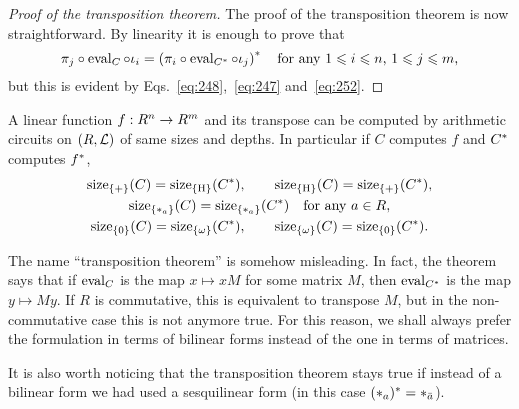 \begin{proof}[Proof of the transposition theorem]
  The proof of the transposition theorem is now straightforward. By linearity
  it is enough to prove that
  \begin{equation}
    \label{eq:242}
    \pi_j\circ\operatorname{eval}_C\circ\iota_i =
    \left(\pi_i\circ\operatorname{eval}_{C^\ast}\circ\iota_j \right)^\ast
    \quad\text{for any $1\leqslant i\leqslant n$, $1\leqslant j\leqslant m$,}
  \end{equation}
  but this is evident by Eqs.~\eqref{eq:248},~\eqref{eq:247}
  and~\eqref{eq:252}.
\end{proof}

\begin{corollary}
  A linear function $f:R^n\rightarrow R^m$ and its transpose can be computed
  by arithmetic circuits on $(R,\mathcal{L})$ of same sizes and depths. In
  particular if $C$ computes $f$ and $C^\ast$ computes $f^\ast$,
  \begin{gather*}
    \operatorname{size}_{\{+\}}(C) = \operatorname{size}_{\{\operatorname{H}\}}(C^\ast), \qquad  
    \operatorname{size}_{\{\operatorname{H}\}}(C) = \operatorname{size}_{\{+\}}(C^\ast), \\
    \operatorname{size}_{\{*_a\}}(C) = \operatorname{size}_{\{*_a\}}(C^\ast)\quad\text{for any $a\in R$},\\
    \operatorname{size}_{\{0\}}(C) = \operatorname{size}_{\{\omega\}}(C^\ast), \qquad 
    \operatorname{size}_{\{\omega\}}(C) = \operatorname{size}_{\{0\}}(C^\ast).
  \end{gather*}
\end{corollary}

\begin{remark}
  \label{rk:tellegen}
  The name ``transposition theorem'' is somehow misleading. In fact,
  the theorem says that if $\operatorname{eval}_C$ is the map $x\mapsto xM$ for some
  matrix $M$, then $\operatorname{eval}_{C^\ast}$ is the map $y\mapsto My$. If $R$
  is commutative, this is equivalent to transpose $M$, but in the
  non-commutative case this is not anymore true. For this reason, we
  shall always prefer the formulation in terms of bilinear forms
  instead of the one in terms of matrices.

  It is also worth noticing that the transposition theorem stays true
  if instead of a bilinear form we had used a sesquilinear form (in
  this case $(*_{a})^\ast=*_{\bar{a}}$).
\end{remark}


